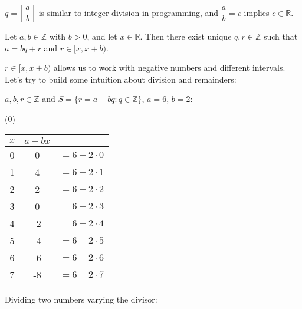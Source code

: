 \begin{Tip}
    $q=\left\lfloor\dfrac{a}{b}\right\rfloor$ is similar to integer division in programming, and $\dfrac{a}{b}=c$ implies $c\in\mathbb{R}$.
\end{Tip}

\newpage

\begin{theo}

    Let $a, b \in \mathbb{Z}$ with $b > 0$, and let $x \in \mathbb{R}$. Then there exist unique $q, r \in \mathbb{Z}$ such that $a = bq + r$ and $r \in [x, x + b)$.
\end{theo}

\noindent
$r \in [x, x + b)$ allows us to work with negative numbers and different intervals. Let's
try to build some intuition about division and remainders:

\begin{center}
    $a,b,r\in\mathbb{Z}$ and $S=\{r=a-bq:q\in\mathbb{Z}\}$, $a=6$, $b=2$:
\end{center}
\begin{center}
    (0)\qquad
    \begin{tabular}{c|cc}
        $x$ & $a-bx$                \\
        \hline
        0   & 0      & $=6-2\cdot0$ \\
        1   & 4      & $=6-2\cdot1$ \\
        2   & 2      & $=6-2\cdot2$ \\
        3   & 0      & $=6-2\cdot3$ \\
        \hline
        4   & -2     & $=6-2\cdot4$ \\
        5   & -4     & $=6-2\cdot5$ \\
        6   & -6     & $=6-2\cdot6$ \\
        7   & -8     & $=6-2\cdot7$ \\
    \end{tabular}
\end{center}

\noindent
Dividing two numbers varying the divisor:


